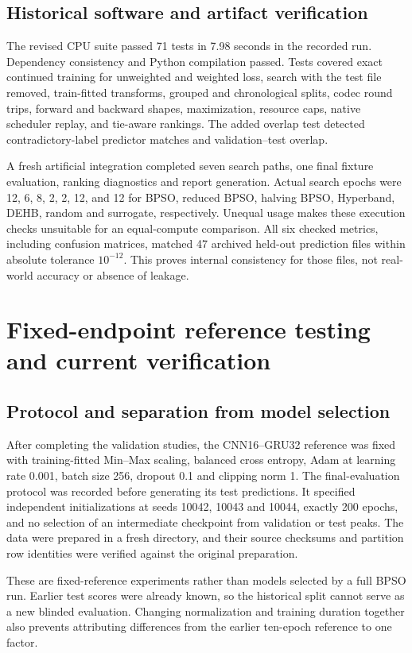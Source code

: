 \documentclass[11pt,a4paper]{report}
\begin{document}
\section{Historical software and artifact verification}
The revised CPU suite passed 71 tests in 7.98 seconds in the recorded run. Dependency consistency and Python compilation passed. Tests covered exact continued training for unweighted and weighted loss, search with the test file removed, train-fitted transforms, grouped and chronological splits, codec round trips, forward and backward shapes, maximization, resource caps, native scheduler replay, and tie-aware rankings. The added overlap test detected contradictory-label predictor matches and validation--test overlap.

A fresh artificial integration completed seven search paths, one final fixture evaluation, ranking diagnostics and report generation. Actual search epochs were 12, 6, 8, 2, 2, 12, and 12 for BPSO, reduced BPSO, halving BPSO, Hyperband, DEHB, random and surrogate, respectively. Unequal usage makes these execution checks unsuitable for an equal-compute comparison. All six checked metrics, including confusion matrices, matched 47 archived held-out prediction files within absolute tolerance $10^{-12}$. This proves internal consistency for those files, not real-world accuracy or absence of leakage.



\chapter{Fixed-endpoint reference testing and current verification}
\section{Protocol and separation from model selection}
After completing the validation studies, the CNN16--GRU32 reference was fixed with training-fitted Min--Max scaling, balanced cross entropy, Adam at learning rate 0.001, batch size 256, dropout 0.1 and clipping norm 1. The final-evaluation protocol was recorded before generating its test predictions. It specified independent initializations at seeds 10042, 10043 and 10044, exactly 200 epochs, and no selection of an intermediate checkpoint from validation or test peaks. The data were prepared in a fresh directory, and their source checksums and partition row identities were verified against the original preparation.

These are fixed-reference experiments rather than models selected by a full BPSO run. Earlier test scores were already known, so the historical split cannot serve as a new blinded evaluation. Changing normalization and training duration together also prevents attributing differences from the earlier ten-epoch reference to one factor.
\end{document}
